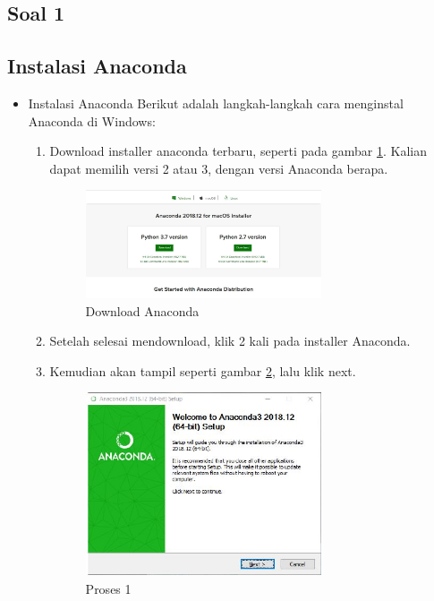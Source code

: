 \subsection{Soal 1}
\subsection{Instalasi Anaconda}
\begin{itemize}
\item Instalasi Anaconda
Berikut adalah langkah-langkah cara menginstal Anaconda di Windows:
\begin{enumerate}
\item Download installer anaconda terbaru, seperti pada gambar \ref{downloadanaconda}. Kalian dapat memilih versi 2 atau 3, dengan versi Anaconda berapa.
\begin{figure}[ht] \centerline{\includegraphics[width=0.70\textwidth]{figures/1/1144124/DownloadAnaconda.JPG}}
	\caption{Download Anaconda}
	\label{downloadanaconda}
\end{figure}
	
\item Setelah selesai mendownload, klik 2 kali pada installer Anaconda.
\item Kemudian akan tampil seperti gambar \ref{gambar1}, lalu klik next.
\begin{figure}[ht]
	\centerline{\includegraphics[width=0.70\textwidth]{figures/1/1144124/a.JPG}}
	\caption{Proses 1 }
	\label{gambar1}
\end{figure}


\end{enumerate}
\end{itemize}
